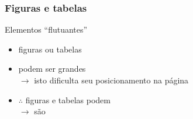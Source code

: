 



\begin{frame}
  \frametitle{Figuras e tabelas}

  \begin{block}{Elementos ``flutuantes''}
    \begin{itemize}
    \item figuras ou tabelas
    \item podem ser grandes\\
      $\to$ isto dificulta seu posicionamento na página
    \item $\therefore$ figuras e tabelas podem \\
      $\to$ são 
    \end{itemize}
  \end{block}

\end{frame}

